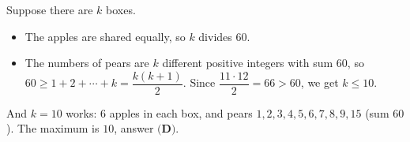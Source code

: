 Suppose there are $k$ boxes.
\begin{itemize}
\item The apples are shared equally, so $k$ divides $60$.
\item The numbers of pears are $k$ different positive integers with sum $60$, so $60\ge1+2+\cdots+k=\dfrac{k(k+1)}{2}$. Since $\dfrac{11\cdot12}{2}=66>60$, we get $k\le10$.
\end{itemize}
And $k=10$ works: $6$ apples in each box, and pears $1,2,3,4,5,6,7,8,9,15$ (sum $60$). The maximum is $10$, answer $\boxed{\textbf{(D)}}$.
